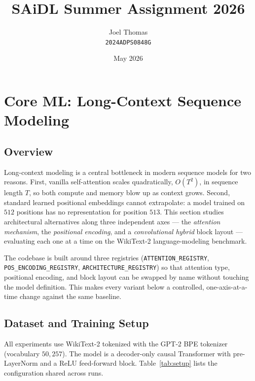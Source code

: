 \documentclass[11pt]{article}
\title{\textbf{SAiDL Summer Assignment 2026}}
\author{Joel Thomas \\ \texttt{2024ADPS0848G}}
\date{May 2026}
\begin{document}
\maketitle
\tableofcontents
\newpage

\section{Core ML: Long-Context Sequence Modeling}
\label{sec:coreml}

\subsection{Overview}
Long-context modeling is a central bottleneck in modern sequence models for two
reasons. First, vanilla self-attention scales quadratically, $O(T^2)$, in
sequence length $T$, so both compute and memory blow up as context grows.
Second, standard learned positional embeddings cannot extrapolate: a model
trained on $512$ positions has no representation for position $513$. This
section studies architectural alternatives along three independent axes ---
the \emph{attention mechanism}, the \emph{positional encoding}, and a
\emph{convolutional hybrid} block layout --- evaluating each one at a time on
the WikiText-2 language-modeling benchmark.

The codebase is built around three registries (\texttt{ATTENTION\_REGISTRY},
\texttt{POS\_ENCODING\_REGISTRY}, \texttt{ARCHITECTURE\_REGISTRY}) so that
attention type, positional encoding, and block layout can be swapped by name
without touching the model definition. This makes every variant below a
controlled, one-axis-at-a-time change against the same baseline.

\subsection{Dataset and Training Setup}
All experiments use WikiText-2 tokenized with the GPT-2 BPE tokenizer
(vocabulary $50{,}257$). The model is a decoder-only causal Transformer with
pre-LayerNorm and a ReLU feed-forward block. Table~\ref{tab:setup} lists the
configuration shared across runs.
\end{document}
